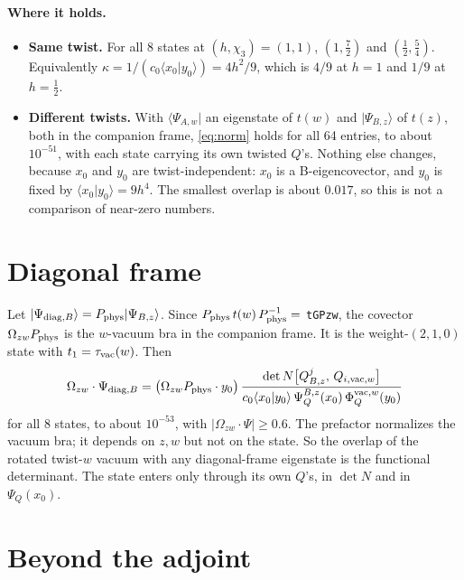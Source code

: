\documentclass[11pt]{article}
\newcommand{\nb}[1]{\texttt{#1}}
\newcommand{\ket}[1]{|#1\rangle}
\begin{document}
\paragraph{Where it holds.}
\begin{itemize}
\item \textbf{Same twist.} For all 8 states at $(h,\chi_3)=(1,1)$, $(1,\tfrac72)$ and $(\tfrac12,\tfrac54)$. Equivalently $\kappa=1/(c_0\langle x_0|y_0\rangle)=4h^2/9$, which is $4/9$ at $h=1$ and $1/9$ at $h=\tfrac12$.
\item \textbf{Different twists.} With $\langle\Psi_{A,w}|$ an eigenstate of $t(w)$ and $\ket{\Psi_{B,z}}$ of $t(z)$, both in the companion frame, \eqref{eq:norm} holds for all 64 entries, to about $10^{-51}$, with each state carrying its own twisted $Q$'s. Nothing else changes, because $x_0$ and $y_0$ are twist-independent: $x_0$ is a B-eigencovector, and $y_0$ is fixed by $\langle x_0|y_0\rangle=9h^4$. The smallest overlap is about $0.017$, so this is not a comparison of near-zero numbers.
\end{itemize}

\section{Diagonal frame}\label{sec:diag}

Let $\ket{\Psi_{{\rm diag},B}}=P_{\rm phys}\ket{\Psi_{B,z}}$. Since $P_{\rm phys}\,t(w)\,P_{\rm phys}^{-1}=$ \nb{tGPzw}, the covector $\Omega_{zw}P_{\rm phys}$ is the $w$-vacuum bra in the companion frame. It is the weight-$(2,1,0)$ state with $t_1=\tau_{\rm vac}(w)$. Then
\begin{equation}
\Omega_{zw}\cdot\Psi_{{\rm diag},B}=\big(\Omega_{zw}P_{\rm phys}\cdot y_0\big)\,\frac{\det N\big[Q^j_{B,z},\,Q_{i,{\rm vac},w}\big]}{c_0\langle x_0|y_0\rangle\,\Psi_Q^{B,z}(x_0)\,\Phi_Q^{{\rm vac},w}(y_0)}
\end{equation}
for all 8 states, to about $10^{-53}$, with $|\Omega_{zw}\cdot\Psi|\ge0.6$. The prefactor normalizes the vacuum bra; it depends on $z,w$ but not on the state. So the overlap of the rotated twist-$w$ vacuum with any diagonal-frame eigenstate is the functional determinant. The state enters only through its own $Q$'s, in $\det N$ and in $\Psi_Q(x_0)$.

\section{Beyond the adjoint}\label{sec:beyond}
\end{document}
